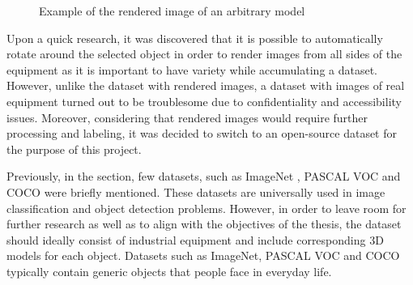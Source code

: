\documentclass[english, 12pt, a4paper, elec, utf8, a-1b, online]{aaltothesis}
\begin{document}
\begin{figure}[htb]
    \centering
    \qquad
    \caption{Example of the rendered image of an arbitrary model}\label{navisworks}%
\end{figure}
\FloatBarrier

Upon a quick research, it was discovered that it is possible to automatically rotate around the selected object in order to render images from all sides of the equipment as it is important to have variety while accumulating a dataset. However, unlike the dataset with rendered images, a dataset with images of real equipment turned out to be troublesome due to confidentiality and accessibility issues. Moreover, considering that rendered images would require further processing and labeling, it was decided to switch to an open-source dataset for the purpose of this project. 

Previously, in the  section, few datasets, such as ImageNet \cite{Russakovsky2014}, PASCAL VOC \cite{Everingham10} and COCO \cite{Lin2014} were briefly mentioned. These datasets are universally used in image classification and object detection problems. However, in order to leave room for further research as well as to align with the objectives of the thesis, the dataset should ideally consist of industrial equipment and include corresponding 3D models for each object. Datasets such as ImageNet, PASCAL VOC and COCO typically contain generic objects that people face in everyday life. 
\end{document}

